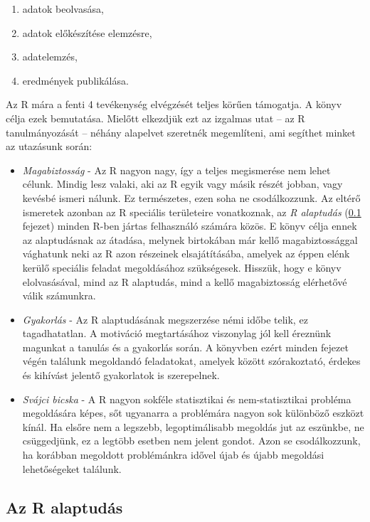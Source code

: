 \documentclass[
]{book}
\providecommand{\tightlist}{%
  \setlength{\itemsep}{0pt}\setlength{\parskip}{0pt}}
\begin{document}
\begin{enumerate}
\def\labelenumi{\arabic{enumi}.}
\tightlist
\item
  adatok beolvasása,
\item
  adatok előkészítése elemzésre,
\item
  adatelemzés,
\item
  eredmények publikálása.
\end{enumerate}

Az R mára a fenti 4 tevékenység elvégzését teljes körűen támogatja. A könyv célja ezek bemutatása. Mielőtt elkezdjük ezt az izgalmas utat -- az R tanulmányozását -- néhány alapelvet szeretnék megemlíteni, ami segíthet minket az utazásunk során:

\begin{itemize}
\tightlist
\item
  \emph{Magabiztosság} - Az R nagyon nagy, így a teljes megismerése nem lehet célunk. Mindig lesz valaki, aki az R egyik vagy másik részét jobban, vagy kevésbé ismeri nálunk. Ez természetes, ezen soha ne csodálkozzunk. Az eltérő ismeretek azonban az R speciális területeire vonatkoznak, az \emph{R alaptudás} (\ref{Ralaptudas} fejezet) minden R-ben jártas felhasználó számára közös. E könyv célja ennek az alaptudásnak az átadása, melynek birtokában már kellő magabiztossággal vághatunk neki az R azon részeinek elsajátításába, amelyek az éppen elénk kerülő speciális feladat megoldásához szükségesek. Hisszük, hogy e könyv elolvasásával, mind az R alaptudás, mind a kellő magabiztosság elérhetővé válik számunkra.
\item
  \emph{Gyakorlás} - Az R alaptudásának megszerzése némi időbe telik, ez tagadhatatlan. A motiváció megtartásához viszonylag jól kell éreznünk magunkat a tanulás és a gyakorlás során. A könyvben ezért minden fejezet végén találunk megoldandó feladatokat, amelyek között szórakoztató, érdekes és kihívást jelentő gyakorlatok is szerepelnek.
\item
  \emph{Svájci bicska} - A R nagyon sokféle statisztikai és nem-statisztikai probléma megoldására képes, sőt ugyanarra a problémára nagyon sok különböző eszközt kínál. Ha elsőre nem a legszebb, legoptimálisabb megoldás jut az eszünkbe, ne csüggedjünk, ez a legtöbb esetben nem jelent gondot. Azon se csodálkozzunk, ha korábban megoldott problémánkra idővel újab és újabb megoldási lehetőségeket találunk.
\end{itemize}

\hypertarget{Ralaptudas}{%
\subsection{Az R alaptudás}\label{Ralaptudas}}
\end{document}
